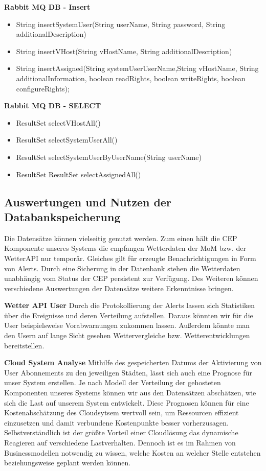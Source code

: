 {\bf Rabbit MQ DB - Insert }
\begin{itemize}
\item String insertSystemUser(String userName, String password, String additionalDescription)
\item String insertVHost(String vHostName, String additionalDescription)
\item String insertAssigned(String systemUserUserName,String vHostName, String additionalInformation, boolean readRights, boolean writeRights, boolean configureRights);
\end{itemize}

{\bf Rabbit MQ DB - SELECT }
\begin{itemize}
\item ResultSet selectVHostAll()
\item ResultSet selectSystemUserAll()
\item ResultSet selectSystemUserByUserName(String userName)
\item ResultSet ResultSet selectAssignedAll()
\end{itemize}



\subsection{Auswertungen und Nutzen der Databankspeicherung}
Die Datensätze können vielseitig genutzt werden. Zum einen hält die CEP Komponente unseres Systems die empfangen Wetterdaten der MoM bzw. der WetterAPI nur temporär. Gleiches gilt für erzeugte Benachrichtigungen in Form von Alerts.
Durch eine Sicherung in der Datenbank stehen die Wetterdaten unabhängig vom Status der CEP persistent zur Verfügung. 
Des Weiteren können verschiedene Auswertungen der Datensätze weitere Erkenntnisse bringen. 

\textbf{Wetter API User}
Durch die Protokollierung der Alerts lassen sich Statistiken über die Ereignisse und deren Verteilung aufstellen. Daraus könnten wir für die User beispielsweise Vorabwarnungen zukommen lassen. Außerdem könnte man den Usern auf lange Sicht gesehen Wettervergleiche bzw. Wetterentwicklungen bereitstellen.

\textbf{Cloud System Analyse}
Mithilfe des gespeicherten Datums der Aktivierung  von User Abonnements zu den jeweiligen Städten, lässt sich auch eine Prognose für unser System erstellen. Je nach Modell der Verteilung der gehosteten Komponenten unseres Systems  können wir aus den Datensätzen abschätzen, wie sich die Last auf unserem System entwickelt. 
Diese Prognosen können für eine Kostenabschätzung des Cloudsytsem wertvoll sein, um Ressourcen effizient einzusetzen und damit verbundene Kostenpunkte besser vorherzusagen.
Selbstverständlich ist der größte Vorteil einer Cloudlösung das dynamische Reagieren auf verschiedene Lastverhalten. Dennoch ist es im Rahmen von Businessmodellen notwendig zu wissen, welche Kosten an welcher Stelle entstehen beziehungsweise geplant werden können.

